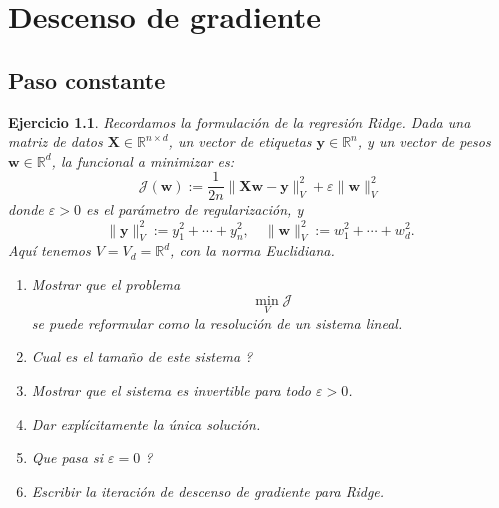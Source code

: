 \documentclass[11pt]{report}
\newtheorem{ex}{Ejercicio}
\newcommand{\norma}[1]{\Vert #1 \Vert_V}
\begin{document}

\chapter{Descenso de gradiente}

\section{Paso constante}

\begin{ex}
Recordamos la formulación de la regresión Ridge. Dada una matriz de datos $ \mathbf{X} \in \mathbb{R}^{n \times d} $, un vector de etiquetas $ \mathbf{y} \in \mathbb{R}^n $, y un vector de pesos $ \mathbf{w} \in \mathbb{R}^d $, la funcional a minimizar es:
$$
\mathcal{J}(\mathbf{w}) := \frac{1}{2n} \| \mathbf{X}\mathbf{w} - \mathbf{y}\|_V^2 + \varepsilon \|\mathbf{w}\|_V^2
$$
donde $ \varepsilon > 0 $ es el parámetro de regularización, y
\[
\|  \mathbf{y}\|_V^2 := y_1^2 + \cdots + y_n^2, \quad
\|\mathbf{w}\|_V^2 := w_1^2 + \cdots + w_d^2. 
\]
Aquí tenemos $V = V_d = \mathbb{R}^d$, con la norma Euclidiana. %

\begin{enumerate}
    \item Mostrar que el problema
    \[
    \min_V \mathcal{J}
    \]
    se puede reformular como la resolución de un sistema lineal.
    
    \item Cual es el tamaño de este sistema ? 
    
    \item Mostrar que el sistema es invertible para todo $\varepsilon > 0$.
    
    \item Dar explícitamente la única solución.
    
    \item Que pasa si $\varepsilon = 0$ ?
    
    \item Escribir la iteración de descenso de gradiente para Ridge.
\end{enumerate}
\end{ex}
\end{document}
